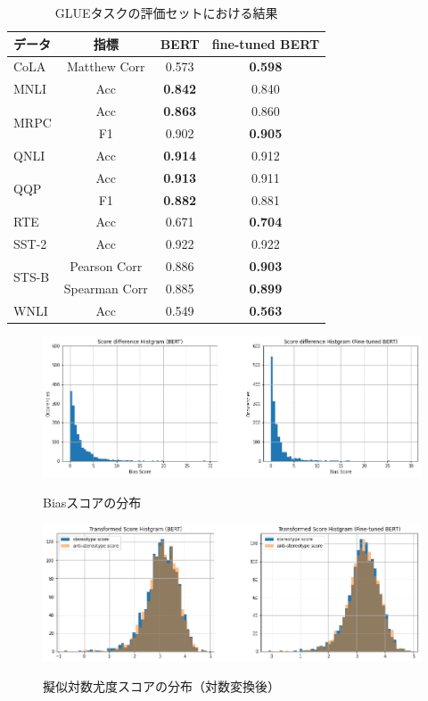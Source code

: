 \documentclass[
  platex, dvipdfmx %
]{nlp2021}
\begin{document}
\begin{table}[h]
\centering
\label{tab:results_glue}
\begin{tabular}{lccc}
\hline
データ & 指標 &  BERT & fine-tuned BERT \\
\hline
CoLA & Matthew Corr & 0.573 & \textbf{0.598} \tnote{*} \\
\hline
MNLI & Acc & \textbf{0.842} \tnote{*} &  0.840  \\
\hline
\multirow{2}{*}{MRPC} & Acc & \textbf{0.863} \tnote{*} &  0.860  \\
 & F1 & 0.902 & \textbf{0.905} \tnote{*} \\
\hline
QNLI & Acc & \textbf{0.914}  \tnote{*} & 0.912 \\
\hline
\multirow{2}{*}{QQP} & Acc & \textbf{0.913}  \tnote{*} & 0.911 \\
 & F1 & \textbf{0.882} & 0.881 \\
\hline
RTE & Acc & 0.671 & \textbf{0.704} \tnote{*} \\
\hline
SST-2 & Acc & 0.922 & 0.922 \\
\hline
\multirow{2}{*}{STS-B} & Pearson Corr & 0.886 & \textbf{0.903}\\
 & Spearman Corr & 0.885 & \textbf{0.899} \\
\hline
WNLI & Acc & 0.549 & \textbf{0.563} \tnote{*} \\
\hline
\end{tabular}
\caption{GLUEタスクの評価セットにおける結果}
\end{table}
	
\begin{figure}[h]
\centering
\includegraphics[width=15cm]{hist_score_diffrerence.png}
\label{fig:hist_bias}
\caption{Biasスコアの分布}
\end{figure}

\begin{figure}[h]
\centering
\includegraphics[width=15cm]{hist_transformed_pseudo_log_likelihood.png}
\label{fig:hist_transformed_log_likelihoods}
\caption{擬似対数尤度スコアの分布（対数変換後）}
\end{figure}
\end{document}
